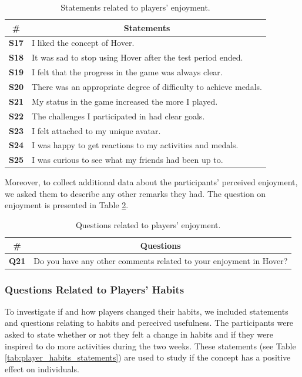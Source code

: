 \begin{table}[H]
    \centering
    \begin{tabularx}{\textwidth}{|c|X|}
        \hline
        \textbf{\#} & \multicolumn{1}{c|}{\textbf{Statements}} \\ \hline
        \textbf{S17} & I liked the concept of Hover. \\
        \textbf{S18} & It was sad to stop using Hover after the test period ended. \\
        \textbf{S19} & I felt that the progress in the game was always clear. \\
        \textbf{S20} & There was an appropriate degree of difficulty to achieve medals. \\
        \textbf{S21} & My status in the game increased the more I played. \\
        \textbf{S22} & The challenges I participated in had clear goals. \\
        \textbf{S23} & I felt attached to my unique avatar. \\
        \textbf{S24} & I was happy to get reactions to my activities and medals. \\
        \textbf{S25} & I was curious to see what my friends had been up to. \\
         \hline
    \end{tabularx}
    \caption{Statements related to players' enjoyment.}
    \label{tab:player_enjoyment_statements}
\end{table}

Moreover, to collect additional data about the participants’ perceived enjoyment, we asked them to describe any other remarks they had. The question on enjoyment is presented in Table \ref{tab:player_enjoyment_questions}.

\begin{table}[H]
    \centering
    \begin{tabularx}{\textwidth}{|c|X|}
        \hline
        \textbf{\#} & \multicolumn{1}{c|}{\textbf{Questions}} \\ \hline
        \textbf{Q21} & Do you have any other comments related to your enjoyment in Hover? \\ \hline
    \end{tabularx}
    \caption{Questions related to players' enjoyment.}
    \label{tab:player_enjoyment_questions}
\end{table}

\subsubsection{Questions Related to Players' Habits}
To investigate if and how players changed their habits, we included statements and questions relating to habits and perceived usefulness. The participants were asked to state whether or not they felt a change in habits and if they were inspired to do more activities during the two weeks. These statements (see Table \ref{tab:player_habits_statements}) are used to study if the concept has a positive effect on individuals.

